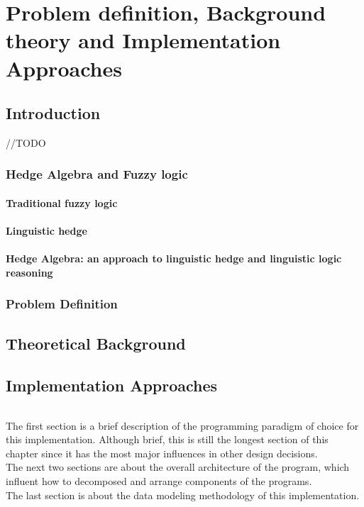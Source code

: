 \documentclass[../gr-final.tex]{subfiles}
\begin{document}
\part{Problem definition, Background theory and Implementation Approaches}
\chapter{Introduction}
{\huge //TODO}
\section{Hedge Algebra and Fuzzy logic}
\subsection{Traditional fuzzy logic}
\subsection{Linguistic hedge}
\subsection{Hedge Algebra: an approach to linguistic hedge and
  linguistic logic reasoning}
\section{Problem Definition}
\chapter{Theoretical Background}




\chapter{Implementation Approaches} 
\paragraph{} The first section is a brief description of the
programming paradigm of choice for this implementation. Although
brief, this is still the longest section of this chapter since
it has the most major influences in other design decisions.\\
The next two sections are about the overall architecture of the
program, which influent how to decomposed and arrange components
of the programs.\\
The last section is about the data modeling methodology of this
implementation. 
\end{document}
